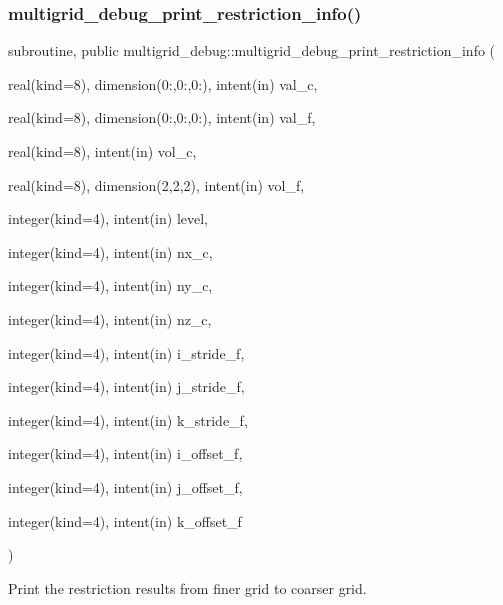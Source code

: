 \subsubsection{\texorpdfstring{multigrid\+\_\+debug\+\_\+print\+\_\+restriction\+\_\+info()}{multigrid\_debug\_print\_restriction\_info()}}
{\footnotesize\ttfamily subroutine, public multigrid\+\_\+debug\+::multigrid\+\_\+debug\+\_\+print\+\_\+restriction\+\_\+info (\begin{DoxyParamCaption}\item[{real(kind=8), dimension(0\+:,0\+:,0\+:), intent(in)}]{val\+\_\+c,  }\item[{real(kind=8), dimension(0\+:,0\+:,0\+:), intent(in)}]{val\+\_\+f,  }\item[{real(kind=8), intent(in)}]{vol\+\_\+c,  }\item[{real(kind=8), dimension(2,2,2), intent(in)}]{vol\+\_\+f,  }\item[{integer(kind=4), intent(in)}]{level,  }\item[{integer(kind=4), intent(in)}]{nx\+\_\+c,  }\item[{integer(kind=4), intent(in)}]{ny\+\_\+c,  }\item[{integer(kind=4), intent(in)}]{nz\+\_\+c,  }\item[{integer(kind=4), intent(in)}]{i\+\_\+stride\+\_\+f,  }\item[{integer(kind=4), intent(in)}]{j\+\_\+stride\+\_\+f,  }\item[{integer(kind=4), intent(in)}]{k\+\_\+stride\+\_\+f,  }\item[{integer(kind=4), intent(in)}]{i\+\_\+offset\+\_\+f,  }\item[{integer(kind=4), intent(in)}]{j\+\_\+offset\+\_\+f,  }\item[{integer(kind=4), intent(in)}]{k\+\_\+offset\+\_\+f }\end{DoxyParamCaption})}



Print the restriction results from finer grid to coarser grid. 


